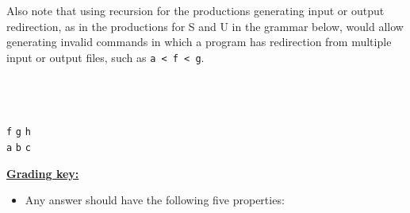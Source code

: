 \documentclass[11pt,fleqn]{article}
\begin{document}
\begin{enumerate}
\begin{multicols}{2}
            \pagebreak

            Also note that using recursion for the productions generating
            input or output redirection, as in the productions for S and U
            in the grammar below, would allow generating invalid commands in
            which a program has redirection from multiple input or output
            files, such as \texttt{a < f < g}.

            \smallskip

            \columnbreak

            \hspace{.2in}
            \begin{minipage}[t]{2.9in}

              \begin{grammar}[2]

                \\

                \\

                \\

                           {\texttt{f} \midspc \texttt{g} \midspc \texttt{h}}
                \\

                           {\texttt{a} \midspc \texttt{b} \midspc \texttt{c}}
                \\

              \end{grammar}

            \end{minipage}

          \end{multicols}

          \vspace{-5mm}

          \begin{info}{\textbf{\underline{Grading key:}}}

            \begin{itemize}

              \addtolength{\itemsep}{1.5mm}

              \item Any answer should have the following five properties:


\end{itemize}
\end{info}
\end{enumerate}
\end{document}
